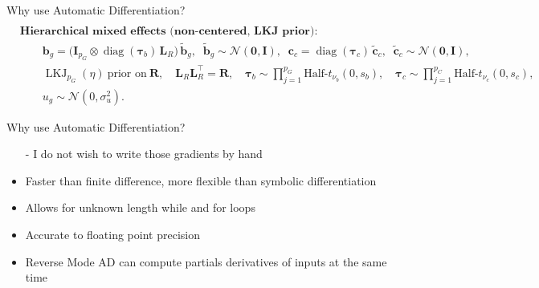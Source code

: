 \documentclass[dvipsnames]{beamer}
\begin{document}
\begin{frame}{Why use Automatic Differentiation?}
\begin{align*}
\\[6pt]
&\textbf{Hierarchical mixed effects (non-centered, LKJ prior):}
\\[-2pt]
&\qquad
\mathbf b_{g}=\big(\mathbf I_{p_G}\otimes\operatorname{diag}(\boldsymbol\tau_b)\,\mathbf L_R\big)\,\tilde{\mathbf b}_{g},
\;\;
\tilde{\mathbf b}_{g}\sim\mathcal N(\mathbf 0,\mathbf I),
\;\;
\mathbf c_{c}=\operatorname{diag}(\boldsymbol\tau_c)\,\tilde{\mathbf c}_{c},
\;\;
\tilde{\mathbf c}_{c}\sim\mathcal N(\mathbf 0,\mathbf I),
\\[-2pt]
&\qquad
\operatorname{LKJ}_{p_G}(\eta)\ \text{prior on}\ \mathbf R,\quad
\mathbf L_R\mathbf L_R^{\!\top}=\mathbf R,
\quad
\boldsymbol\tau_b\sim\prod_{j=1}^{p_G}\text{Half-}t_{\nu_b}(0,s_b),
\quad
\boldsymbol\tau_c\sim\prod_{j=1}^{p_C}\text{Half-}t_{\nu_c}(0,s_c),
\\[-2pt]
&\qquad
u_g\sim\mathcal N(0,\sigma_u^2).
\end{align*}


\end{frame}
\begin{frame}{Why use Automatic Differentiation?}
\begin{itemize}
\item[-] I do not wish to write those gradients by hand 
\pause
\item Faster than finite difference, more flexible than symbolic differentiation
\pause
\item Allows for unknown length while and for loops
\pause
\item Accurate to floating point precision
\pause
\item Reverse Mode AD can compute partials derivatives of inputs at the same time
\end{itemize}
\end{frame}

\end{document}
